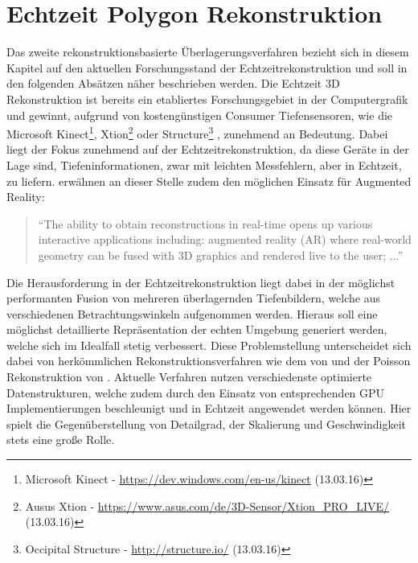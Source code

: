 \section{Echtzeit Polygon Rekonstruktion} \label{sec:polygon_reconstruction}

Das zweite rekonstruktionsbasierte Überlagerungsverfahren bezieht sich in diesem Kapitel auf den aktuellen Forschungsstand der Echtzeitrekonstruktion und soll in den folgenden Absätzen näher beschrieben werden. Die Echtzeit 3D Rekonstruktion ist bereits ein etabliertes Forschungsgebiet in der Computergrafik und gewinnt, aufgrund von kostengünstigen Consumer Tiefensensoren, wie die Microsoft Kinect\footnote{Microsoft Kinect - \url{https://dev.windows.com/en-us/kinect} (13.03.16)}, Xtion\footnote{Ausus Xtion - \url{https://www.asus.com/de/3D-Sensor/Xtion_PRO_LIVE/} (13.03.16)} oder Structure\footnote{Occipital Structure - \url{http://structure.io/} (13.03.16)} , zunehmend an Bedeutung. Dabei liegt der Fokus zunehmend auf der Echtzeitrekonstruktion, da diese Geräte in der Lage sind, Tiefeninformationen, zwar mit leichten Messfehlern, aber in Echtzeit, zu liefern. \citet{niessner2013real} erwähnen an dieser Stelle zudem den möglichen Einsatz für Augmented Reality:

\begin{quote}
\enquote{The ability to obtain reconstructions
in real-time opens up various interactive applications including:
augmented reality (AR) where real-world geometry can be fused
with 3D graphics and rendered live to the user; ...} \citep{niessner2013real}
\end{quote}

Die Herausforderung in der Echtzeitrekonstruktion liegt dabei in der möglichst performanten Fusion von mehreren überlagernden Tiefenbildern, welche aus verschiedenen Betrachtungswinkeln aufgenommen werden. Hieraus soll eine möglichst detaillierte Repräsentation der echten Umgebung generiert werden, welche sich im Idealfall stetig verbessert. Diese Problemstellung unterscheidet sich dabei von herkömmlichen Rekonstruktionsverfahren wie dem von \citet{hoppe1992surface} und der Poisson Rekonstruktion von \citet{kazhdan2006poisson}. Aktuelle Verfahren nutzen verschiedenste optimierte Datenstrukturen, welche zudem durch den Einsatz von entsprechenden GPU Implementierungen beschleunigt und in Echtzeit angewendet werden können. Hier spielt die Gegenüberstellung von Detailgrad, der Skalierung und Geschwindigkeit stets eine große Rolle. \citep{niessner2013real} 

